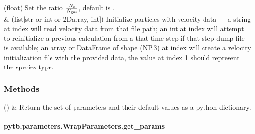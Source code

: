 \documentclass[letterpaper,10pt,english,openany,oneside]{sphinxmanual}
\begin{document}
\begin{fulllineitems}
\begin{savenotes}
\begin{tabulary}{\linewidth}[t]{}
(float) Set the ratio \(\frac{N_{\rm e}}{N_{\rm gas}}\), default is .
\\
\sphinxhline
\sphinxAtStartPar
{}
&
\sphinxAtStartPar
(list{[}str or int or 2D\sphinxhyphen{}array, int{]}) Initialize particles with velocity data — a string at index  will read velocity data from that file path; an int at index  will attempt to reinitialize a previous calculation from a that time step if that step dump file is available; an array or DataFrame of shape (NP,3) at index  will create a velocity initialization file with the provided data, the value at index 1 should represent the species type.
\\
\sphinxbottomrule
\end{tabulary}
\sphinxtableafterendhook\par
\sphinxattableend\end{savenotes}
\subsubsection*{Methods}


\begin{savenotes}\sphinxattablestart
\sphinxthistablewithglobalstyle
\sphinxthistablewithnovlinesstyle
\centering
\begin{tabulary}{\linewidth}[t]{}
\sphinxtoprule
\sphinxtableatstartofbodyhook
\sphinxAtStartPar
{\hyperref[\detokenize{api/pytb.parameters.WrapParameters.get_params:pytb.parameters.WrapParameters.get_params}]{}}()
&
\sphinxAtStartPar
Return the set of parameters and their default values as a python dictionary.
\\
\sphinxbottomrule
\end{tabulary}
\sphinxtableafterendhook\par
\sphinxattableend\end{savenotes}

\sphinxstepscope


\paragraph{pytb.parameters.WrapParameters.get\_params}
\label{\detokenize{api/pytb.parameters.WrapParameters.get_params:pytb-parameters-wrapparameters-get-params}}\label{\detokenize{api/pytb.parameters.WrapParameters.get_params::doc}}


\end{fulllineitems}
\end{document}
